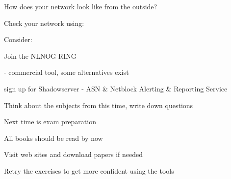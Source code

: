 \documentclass[Screen16to9,17pt]{foils}
\begin{document}

\begin{list1}
\item How does your network look like from the outside?
\item Check your network using:
\item {}
\item Consider:
\begin{list2}
  \item Join the NLNOG RING 
\item {} - commercial tool, some alternatives exist
\item {} sign up for Shadowserver - ASN \& Netblock Alerting \& Reporting Service
\end{list2}
\end{list1}



\begin{list1}
\item Think about the subjects from this time, write down questions

\item Next time is exam preparation
\item All books should be read by now
\item Visit web sites and download papers if needed
\item Retry the exercises to get more confident using the tools
\end{list1}
\end{document}
